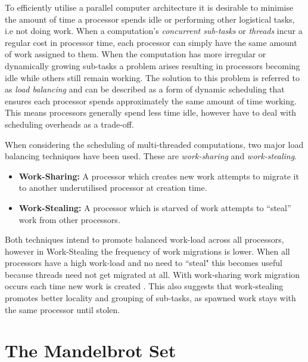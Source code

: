 To efficiently utilise a parallel computer architecture it is desirable to minimise
the amount of time a processor spends idle or performing other logistical tasks, i.e not doing work. 
When a computation's \textit{concurrent sub-tasks} or \textit{threads} incur a regular cost in processor
time, each processor can simply have the same amount of work assigned to them. When the computation has
more irregular or dynamically growing sub-tasks a problem arises resulting in 
processors becoming idle while others still remain working. The solution to this problem is referred to as
\textit{load balancing} and can be described as a form of dynamic scheduling that ensures each processor 
spends approximately the same amount of time working. This means processors generally spend
less time idle, however have to deal with scheduling overheads as a trade-off.

When considering the scheduling of multi-threaded computations, two major load balancing techniques have been used.
These are \textit{work-sharing} and \textit{work-stealing}.

\begin{itemize}
\item \textbf{Work-Sharing:} A processor which creates new work attempts to migrate it to another underutilised processor at creation time. 
\item \textbf{Work-Stealing:} A processor which is starved of work attempts to ``steal'' work from other processors. 
\end{itemize}

Both techniques intend to promote balanced work-load across all processors, however in Work-Stealing
the frequency of work migrations is lower. When all processors have a 
high work-load and no need to ``steal" this becomes useful because threads need not get 
migrated at all. With work-sharing work migration occurs each time new work is created \cite{blumleis}.
This also suggests that work-stealing promotes better locality and grouping of sub-tasks, as spawned work 
stays with the same processor until stolen.

\section{The Mandelbrot Set}

